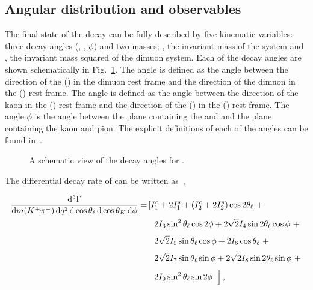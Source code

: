 \subsection{Angular distribution and observables}
\label{sec:kpimm:angular-distribution}

The final state of the decay \BdToKpimm can be fully described by five kinematic variables: three decay angles (\ctl, \ctk, $\phi$) and two masses; \mkpi, the invariant mass of the \kaon\pion system and \qsq, the invariant mass squared of the dimuon system. Each of the decay angles are shown schematically in Fig.~\ref{fig:kpimm:angles}. The angle \thetal is defined as the angle between the direction of the \mup (\mun) in the dimuon rest frame and the direction of the dimuon in the \Bz (\Bzb) rest frame. The angle \thetak is defined as the angle between the direction of the kaon in the \KstarJ (\KstarJb) rest frame and the direction of the \KstarJ (\KstarJb) in the \Bz (\Bzb) rest frame. The angle $\phi$ is the angle between the plane containing the \mup and \mun and the plane containing the kaon and pion. The explicit definitions of each of the angles can be found in~\cite{kstmm-1fb}.

\begin{figure}[!tb]
  \centering
  
  \caption{A schematic view of the decay angles for \BdToKpimm.}
  \label{fig:kpimm:angles}
\end{figure}

The differential decay rate of \BdToKpimm can be written as~\cite{altmannshofer},

\begin{equation}
\begin{aligned}
\frac{\mathrm{d}^{5}\Gamma}{\mathrm{d}m({{K}^+}{{\pi}^-})\,\mathrm{d}{q^2}\,\mathrm{d}\cos\theta_{\ell}\,\mathrm{d}\cos\theta_{K}\,\mathrm{d}\phi} = & \left[ I_1^c+2I_1^s+(I_2^c+2I_2^s)\cos2\theta_{\ell}~+ \right.\\
& \left. ~\frac{}{} 2I_3\sin^2\theta_{\ell}\cos2\phi+2\sqrt{2}I_4\sin2\theta_{\ell}\cos\phi~+ \right.\\
& \left. ~\frac{}{} 2\sqrt{2}I_5\sin\theta_{\ell}\cos\phi+2I_6\cos\theta_{\ell}~+ \right. \\
& \left. ~\frac{}{} 2\sqrt{2}I_7\sin\theta_{\ell}\sin\phi+2\sqrt{2}I_8\sin2\theta_{\ell}\sin\phi~+ \right. \\
& \left. ~\frac{}{} 2I_9\sin^2\theta_{\ell}\sin2\phi \frac{}{}~\right],
\end{aligned}
\end{equation}

